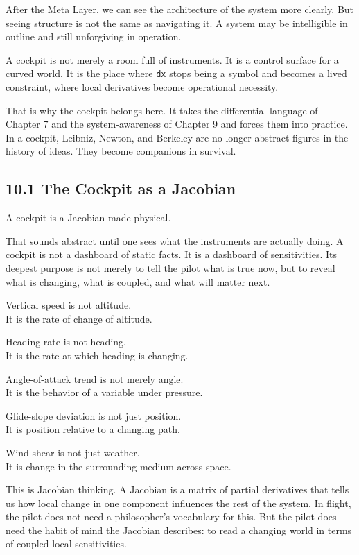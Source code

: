 After the Meta Layer, we can see the architecture of the system more
clearly. But seeing structure is not the same as navigating it. A system
may be intelligible in outline and still unforgiving in operation.

A cockpit is not merely a room full of instruments. It is a control
surface for a curved world. It is the place where \texttt{dx} stops
being a symbol and becomes a lived constraint, where local derivatives
become operational necessity.

That is why the cockpit belongs here. It takes the differential language
of Chapter 7 and the system-awareness of Chapter 9 and forces them into
practice. In a cockpit, Leibniz, Newton, and Berkeley are no longer
abstract figures in the history of ideas. They become companions in
survival.

\hypertarget{the-cockpit-as-a-jacobian}{%
\subsection{10.1 The Cockpit as a
Jacobian}\label{the-cockpit-as-a-jacobian}}

A cockpit is a Jacobian made physical.

That sounds abstract until one sees what the instruments are actually
doing. A cockpit is not a dashboard of static facts. It is a dashboard
of sensitivities. Its deepest purpose is not merely to tell the pilot
what is true now, but to reveal what is changing, what is coupled, and
what will matter next.

Vertical speed is not altitude.\\
It is the rate of change of altitude.

Heading rate is not heading.\\
It is the rate at which heading is changing.

Angle-of-attack trend is not merely angle.\\
It is the behavior of a variable under pressure.

Glide-slope deviation is not just position.\\
It is position relative to a changing path.

Wind shear is not just weather.\\
It is change in the surrounding medium across space.

This is Jacobian thinking. A Jacobian is a matrix of partial derivatives
that tells us how local change in one component influences the rest of
the system. In flight, the pilot does not need a philosopher's
vocabulary for this. But the pilot does need the habit of mind the
Jacobian describes: to read a changing world in terms of coupled local
sensitivities.

